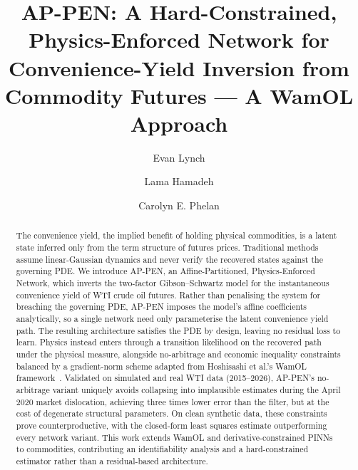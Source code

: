 \documentclass[sigconf, authorversion=true, nonacm=true]{acmart}
\begin{document}
\title[AP-PEN: Physics-Enforced Convenience-Yield Inversion]{AP-PEN: A Hard-Constrained,
Physics-Enforced Network for Convenience-Yield Inversion from Commodity Futures ---
A WamOL Approach}

\author{Evan Lynch}

\author{Lama Hamadeh}

\author{Carolyn E. Phelan}

\renewcommand{\shortauthors}{Lynch et al.}

\begin{abstract}
The convenience yield, the implied benefit of holding physical commodities, is a latent state inferred only from the term structure of futures prices. Traditional methods assume linear-Gaussian dynamics and never verify the recovered states against the governing PDE. We introduce AP-PEN, an Affine-Partitioned, Physics-Enforced Network, which inverts the two-factor Gibson--Schwartz model for the instantaneous convenience yield of WTI crude oil futures. Rather than penalising the system for breaching the governing PDE, AP-PEN imposes the model's affine coefficients analytically, so a single network need only parameterise the latent convenience yield path. The resulting architecture satisfies the PDE by design, leaving no residual loss to learn. Physics instead enters through a transition likelihood on the recovered path under the physical measure, alongside no-arbitrage and economic inequality constraints balanced by a gradient-norm scheme adapted from Hoshisashi et al.'s WamOL framework~\cite{Hoshisashi2024Whack-a-moleSurface}. Validated on simulated and real WTI data (2015--2026), AP-PEN's no-arbitrage variant uniquely avoids collapsing into implausible estimates during the April 2020 market dislocation, achieving three times lower error than the filter, but at the cost of degenerate structural parameters. On clean synthetic data, these constraints prove counterproductive, with the closed-form least squares estimate outperforming every network variant. This work extends WamOL and derivative-constrained PINNs to commodities, contributing an identifiability analysis and a hard-constrained estimator rather than a residual-based architecture.
\end{abstract}
\end{document}
